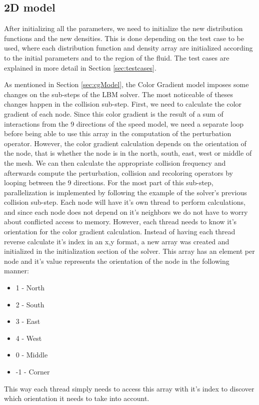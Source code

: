 \documentclass[12pt]{book}
\begin{document}
\subsection{2D model}
After initializing all the parameters, we need to initialize the new distribution functions and the new densities. This is done depending on the test case to be used, where each distribution function and density array are initialized according to the initial parameters and to the region of the fluid. The test cases are explained in more detail in Section \ref{sec:testcases}. \par
As mentioned in Section \ref{sec:cgModel}, the Color Gradient model imposes some changes on the sub-steps of the LBM solver. The most noticeable of theses changes happen in the collision sub-step. First, we need to calculate the color gradient of each node. Since this color gradient is the result of a sum of interactions from the 9 directions of the speed model, we need a separate loop before being able to use this array in the computation of the perturbation operator. However, the color gradient calculation depends on the orientation of the node, that is whether the node is in the north, south, east, west or middle of the mesh. We can then calculate the appropriate collision frequency and afterwards compute the perturbation, collision and recoloring operators by looping between the 9 directions. For the most part of this sub-step, parallelization is implemented by following the example of the solver's previous collision sub-step. Each node will have it's own thread to perform calculations, and since each node does not depend on it's neighbors we do not have to worry about conflicted access to memory. However, each thread needs to know it's orientation for the color gradient calculation. Instead of having each thread reverse calculate it's index in an x,y format, a new array was created and initialized in the initialization section of the solver. This array has an element per node and it's value represents the orientation of the node in the following manner:
\begin{itemize}
	\item 1 - North
	\item 2 - South 
	\item 3 - East 
	\item 4 - West 
	\item 0 - Middle
	\item -1 - Corner    
\end{itemize}
This way each thread simply needs to access this array with it's index to discover which orientation it needs to take into account. \par
\end{document}
